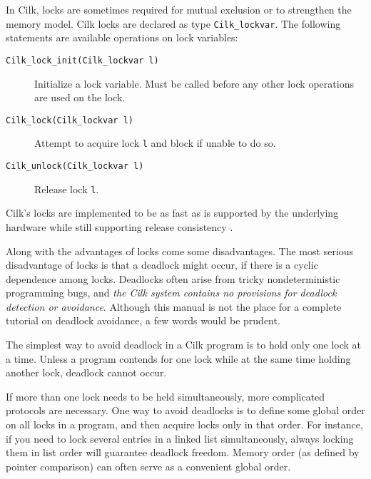 In Cilk, locks are sometimes required for mutual exclusion or to
strengthen the memory model. Cilk locks are declared as type
\texttt{Cilk\_lockvar}.  The following statements are available
operations on lock variables:

\begin{description}

\item[\texttt{Cilk\_lock\_init(Cilk\_lockvar l)}] Initialize a lock variable.
Must be called before any other lock operations are used on the lock.

\item[\texttt{Cilk\_lock(Cilk\_lockvar l)}] Attempt to acquire lock \texttt{l}
and block if unable to do so.

\item[\texttt{Cilk\_unlock(Cilk\_lockvar l)}] Release lock \texttt{l}.
\end{description}


Cilk's locks are implemented to be as fast as is supported by the
underlying hardware while still supporting release consistency
\cite[p.~716]{HennessyPa96}. 


Along with the advantages of locks come some disadvantages.  The most
serious disadvantage of locks is that a deadlock might occur, if there
is a cyclic dependence among locks.  Deadlocks often arise from tricky
nondeterministic programming bugs, and {\em the Cilk system contains
  no provisions for deadlock detection or avoidance}.  Although this
manual is not the place for a complete tutorial on deadlock avoidance,
a few words would be prudent.

The simplest way to avoid deadlock in a Cilk program is to hold only
one lock at a time.  Unless a program contends for one lock while at
the same time holding another lock, deadlock cannot occur.

If more than one lock needs to be held simultaneously, more
complicated protocols are necessary.  One way to avoid deadlocks is to
define some global order on all locks in a program, and then acquire
locks only in that order.  For instance, if you need to lock several
entries in a linked list simultaneously, always locking them in list
order will guarantee deadlock freedom.  Memory order (as defined by
pointer comparison) can often serve as a convenient global order.

